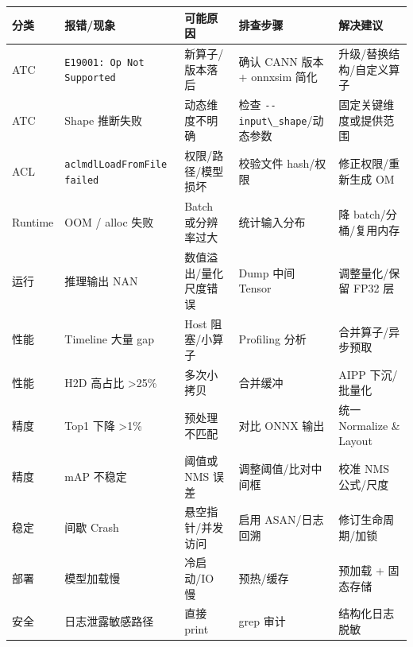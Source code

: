 \begin{longtable}[]{@{}
  >{\raggedright\arraybackslash}p{}
  >{\raggedright\arraybackslash}p{}
  >{\raggedright\arraybackslash}p{}
  >{\raggedright\arraybackslash}p{}
  >{\raggedright\arraybackslash}p{}@{}}
\toprule\noalign{}
\begin{minipage}[b]{\linewidth}\raggedright
分类
\end{minipage} & \begin{minipage}[b]{\linewidth}\raggedright
报错/现象
\end{minipage} & \begin{minipage}[b]{\linewidth}\raggedright
可能原因
\end{minipage} & \begin{minipage}[b]{\linewidth}\raggedright
排查步骤
\end{minipage} & \begin{minipage}[b]{\linewidth}\raggedright
解决建议
\end{minipage} \\
\midrule\noalign{}
\endhead
\bottomrule\noalign{}
\endlastfoot
ATC & \passthrough{\lstinline!E19001: Op Not Supported!} &
新算子/版本落后 & 确认 CANN 版本 + onnxsim 简化 &
升级/替换结构/自定义算子 \\
ATC & Shape 推断失败 & 动态维度不明确 & 检查
\passthrough{\lstinline!--input\_shape!}/动态参数 &
固定关键维度或提供范围 \\
ACL & \passthrough{\lstinline!aclmdlLoadFromFile failed!} &
权限/路径/模型损坏 & 校验文件 hash/权限 & 修正权限/重新生成 OM \\
Runtime & OOM / alloc 失败 & Batch 或分辨率过大 & 统计输入分布 & 降
batch/分桶/复用内存 \\
运行 & 推理输出 NAN & 数值溢出/量化尺度错误 & Dump 中间 Tensor &
调整量化/保留 FP32 层 \\
性能 & Timeline 大量 gap & Host 阻塞/小算子 & Profiling 分析 &
合并算子/异步预取 \\
性能 & H2D 高占比 \textgreater25\% & 多次小拷贝 & 合并缓冲 & AIPP
下沉/批量化 \\
精度 & Top1 下降 \textgreater1\% & 预处理不匹配 & 对比 ONNX 输出 & 统一
Normalize \& Layout \\
精度 & mAP 不稳定 & 阈值或 NMS 误差 & 调整阈值/比对中间框 & 校准 NMS
公式/尺度 \\
稳定 & 间歇 Crash & 悬空指针/并发访问 & 启用 ASAN/日志回溯 &
修订生命周期/加锁 \\
部署 & 模型加载慢 & 冷启动/IO 慢 & 预热/缓存 & 预加载 + 固态存储 \\
安全 & 日志泄露敏感路径 & 直接 print & grep 审计 & 结构化日志脱敏 \\
\end{longtable}

